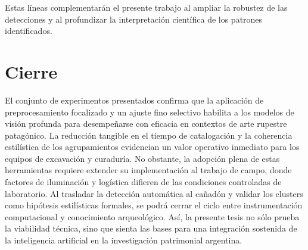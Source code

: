 Estas líneas complementarán el presente trabajo al ampliar la robustez de las detecciones y al profundizar la interpretación científica de los patrones identificados.

\section{Cierre}

El conjunto de experimentos presentados confirma que la aplicación de preprocesamiento focalizado y un ajuste fino selectivo habilita a los modelos de visión profunda para desempeñarse con eficacia en contextos de arte rupestre patagónico.
La reducción tangible en el tiempo de catalogación y la coherencia estilística de los agrupamientos evidencian un valor operativo inmediato para los equipos de excavación y curaduría.
No obstante, la adopción plena de estas herramientas requiere extender su implementación al trabajo de campo, donde factores de iluminación y logística difieren de las condiciones controladas de laboratorio.
Al trasladar la detección automática al cañadón y validar los clusters como hipótesis estilísticas formales, se podrá cerrar el ciclo entre instrumentación computacional y conocimiento arqueológico.
Así, la presente tesis no sólo prueba la viabilidad técnica, sino que sienta las bases para una integración sostenida de la inteligencia artificial en la investigación patrimonial argentina.
